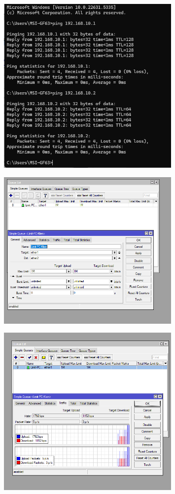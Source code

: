 \begin{figure}[H]
\centering
\includegraphics[width=0.8\textwidth]{P1/img/Screenshot 2025-06-05 191047.png}
\end{figure}
\begin{figure}[H]
\centering
\includegraphics[width=0.8\textwidth]{P1/img/Screenshot 2025-06-05 191336.png}
\end{figure}
\begin{figure}[H]
\centering
\includegraphics[width=0.8\textwidth]{P1/img/Screenshot 2025-06-05 191431.png}
\end{figure}
